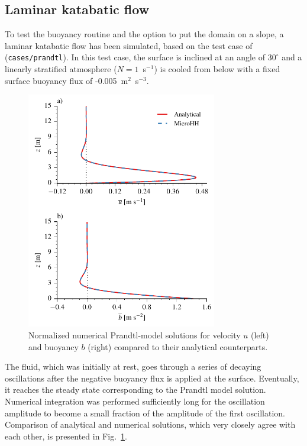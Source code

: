 \documentclass[gmd,manuscript]{copernicus}
\begin{document}
\subsection{Laminar katabatic flow} \label{sec:laminarkatabatic}
To test the buoyancy routine and the option to put the domain on a slope, a laminar katabatic flow has been simulated, based on the test case of \citet{Prandtl1942} (\texttt{cases/prandtl}). In this test case, the surface is inclined at an angle of $30^{\circ}$ and a linearly stratified atmosphere ($N = 1$~s$^{-1}$) is cooled from below with a fixed surface buoyancy flux of -0.005~m$^2$~s$^{-3}$.

\begin{figure}[t]
	\vspace*{2mm}
	\begin{center}
		\includegraphics[width=8.3cm]{figs/prandtlslope.pdf}
	\end{center}
	\caption{Normalized numerical Prandtl-model solutions for velocity $u$ (left) and buoyancy $b$ (right) compared to their analytical counterparts.}
	\label{fig:prandtl}
\end{figure}

The fluid, which was initially at rest, goes through a series of decaying oscillations after the negative buoyancy flux is applied at the surface. Eventually, it reaches the steady state corresponding to the Prandtl model solution. Numerical integration was performed sufficiently long for the oscillation amplitude to become a small fraction of the amplitude of the first oscillation. Comparison of analytical and numerical solutions, which very closely agree with each other, is presented in Fig.~\ref{fig:prandtl}.
\end{document}

